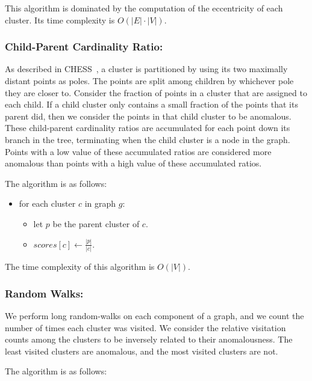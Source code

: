 This algorithm is dominated by the computation of the eccentricity of each cluster.
Its time complexity is $O(|E| \cdot |V|)$.

\subsubsection{Child-Parent Cardinality Ratio:}
As described in CHESS~\cite{ishaq2019clustered}, a cluster is partitioned by using its two maximally distant points as poles.
The points are split among children by whichever pole they are closer to.
Consider the fraction of points in a cluster that are assigned to each child.
If a child cluster only contains a small fraction of the points that its parent did, then we consider the points in that child cluster to be anomalous.
These child-parent cardinality ratios are accumulated for each point down its branch in the tree, terminating when the child cluster is a node in the graph.
Points with a low value of these accumulated ratios are considered more anomalous than points with a high value of these accumulated ratios.

The algorithm is as follows:

\begin{itemize}
    \item for each cluster $c$ in graph $g$:
    \begin{itemize}
        \item let $p$ be the parent cluster of $c$.
        \item $scores[c] \leftarrow \frac{|p|}{|c|}$.
    \end{itemize}
\end{itemize}

The time complexity of this algorithm is $O(|V|)$.


\subsubsection{Random Walks:}
We perform long random-walks on each component of a graph, and we count the number of times each cluster was visited.
We consider the relative visitation counts among the clusters to be inversely related to their anomalousness.
The least visited clusters are anomalous, and the most visited clusters are not.

The algorithm is as follows:


